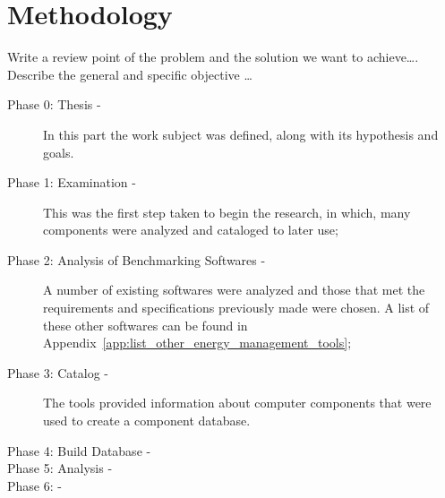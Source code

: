

\chapter{Methodology} \label{chap3:methodology}

    Write a review point of the problem and the solution we want to achieve\ldots. Describe the general and specific objective \ldots
    
    \begin{description}
        \item[Phase 0: Thesis -] In this part the work subject was defined, along with its hypothesis and goals.
        \item[Phase 1: Examination -] This was the first step taken to begin the research, in which, many components were analyzed and cataloged to later use;
        \item[Phase 2: Analysis of Benchmarking Softwares -] A number of existing softwares were analyzed and those that met the requirements and specifications previously made were chosen. A list of these other softwares can be found in Appendix~\ref{app:list_other_energy_management_tools};
        \item[Phase 3: Catalog -] The tools provided information about computer components that were used to create a component database.
        \item[Phase 4: Build Database -] 
        \item[Phase 5: Analysis -] 
        \item[Phase 6: -] 
    \end{description}


